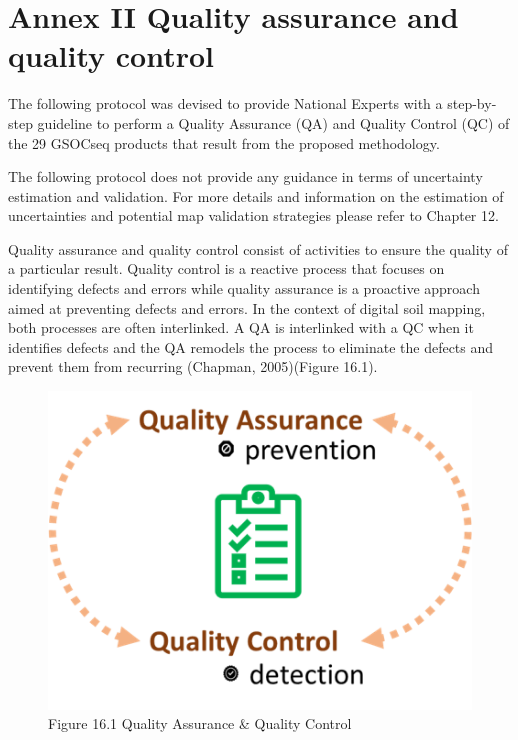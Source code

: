 \documentclass[
  10pt,
  b5paper,
]{book}
\begin{document}
\hypertarget{annex-ii-quality-assurance-and-quality-control}{%
\chapter*{Annex II Quality assurance and quality control}\label{annex-ii-quality-assurance-and-quality-control}}

The following protocol was devised to provide National Experts with a step-by-step guideline to perform a Quality Assurance (QA) and Quality Control (QC) of the 29 GSOCseq products that result from the proposed methodology.

The following protocol does not provide any guidance in terms of uncertainty estimation and validation. For more details and information on the estimation of uncertainties and potential map validation strategies please refer to Chapter 12.

Quality assurance and quality control consist of activities to ensure the quality of a particular result. Quality control is a reactive process that focuses on
identifying defects and errors while quality assurance is a proactive approach aimed at preventing defects and errors. In the context of digital soil mapping, both processes are often interlinked. A QA is interlinked with a QC when it identifies defects and the QA remodels the process to eliminate the defects and prevent them from recurring (Chapman, 2005)(Figure 16.1).

\begin{figure}
\centering
\includegraphics{images/Figure_16.png}
\caption{Figure 16.1 Quality Assurance \& Quality Control}
\end{figure}
\end{document}
